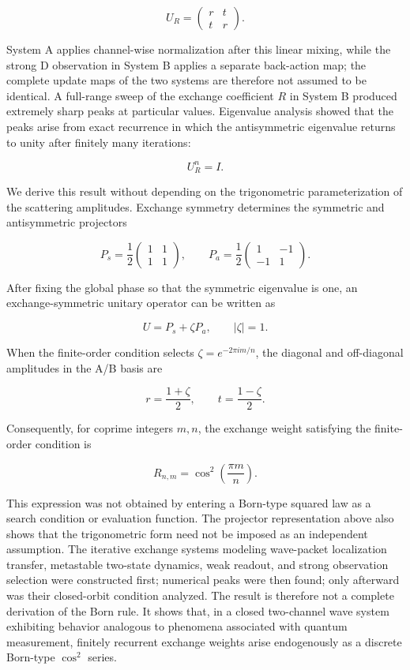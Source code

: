 \documentclass[
  a4paper,
  10pt]{article}
\begin{document}
\[
U_R=
\begin{pmatrix}
r&t\\
t&r
\end{pmatrix}.
\]

System A applies channel-wise normalization after this linear mixing,
while the strong D observation in System B applies a separate
back-action map; the complete update maps of the two systems are
therefore not assumed to be identical. A full-range sweep of the
exchange coefficient \(R\) in System B produced extremely sharp peaks at
particular values. Eigenvalue analysis showed that the peaks arise from
exact recurrence in which the antisymmetric eigenvalue returns to unity
after finitely many iterations:

\[
U_R^n=I.
\]

We derive this result without depending on the trigonometric
parameterization of the scattering amplitudes. Exchange symmetry
determines the symmetric and antisymmetric projectors

\[
P_s=\frac12
\begin{pmatrix}
1&1\\
1&1
\end{pmatrix},
\qquad
P_a=\frac12
\begin{pmatrix}
1&-1\\
-1&1
\end{pmatrix}.
\]

After fixing the global phase so that the symmetric eigenvalue is one,
an exchange-symmetric unitary operator can be written as

\[
U=P_s+\zeta P_a,
\qquad |\zeta|=1.
\]

When the finite-order condition selects \(\zeta=e^{-2\pi im/n}\), the
diagonal and off-diagonal amplitudes in the A/B basis are

\[
r=\frac{1+\zeta}{2},
\qquad
t=\frac{1-\zeta}{2}.
\]

Consequently, for coprime integers \(m,n\), the exchange weight
satisfying the finite-order condition is

\[
\boxed{
R_{n,m}=\cos^2\left(\frac{\pi m}{n}\right)
}.
\]

This expression was not obtained by entering a Born-type squared law as
a search condition or evaluation function. The projector representation
above also shows that the trigonometric form need not be imposed as an
independent assumption. The iterative exchange systems modeling
wave-packet localization transfer, metastable two-state dynamics, weak
readout, and strong observation selection were constructed first;
numerical peaks were then found; only afterward was their closed-orbit
condition analyzed. The result is therefore not a complete derivation of
the Born rule. It shows that, in a closed two-channel wave system
exhibiting behavior analogous to phenomena associated with quantum
measurement, finitely recurrent exchange weights arise endogenously as a
discrete Born-type \(\cos^2\) series.
\end{document}
